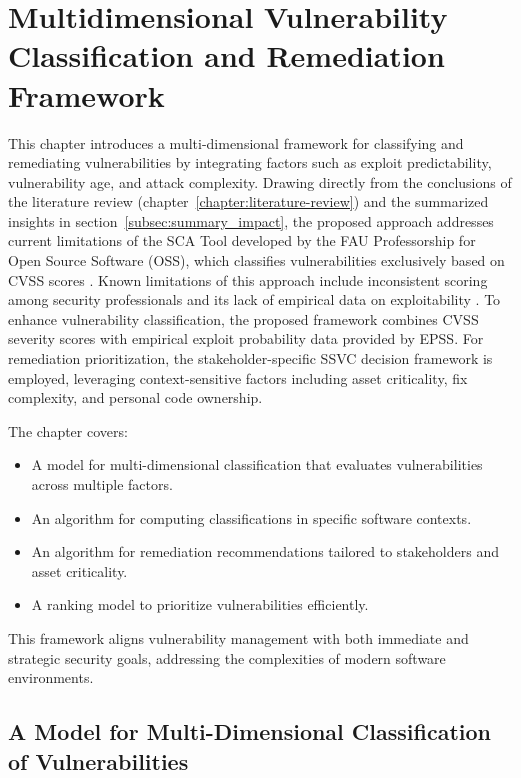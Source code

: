 \chapter{Multidimensional Vulnerability \\ Classification and Remediation Framework}
\label{chapter:multidimensional-vulnerability-classification}

This chapter introduces a multi-dimensional framework for classifying and remediating vulnerabilities by integrating factors such as exploit predictability, vulnerability age, and attack complexity. Drawing directly from the conclusions of the literature review (chapter~\ref{chapter:literature-review}) and the summarized insights in section~\ref{subsec:summary_impact}, the proposed approach addresses current limitations of the \ac{SCA} Tool developed by the \ac{FAU} Professorship for Open Source Software (\ac{OSS}), which classifies vulnerabilities exclusively based on \ac{CVSS} scores \autocite{nehrke_webdienst_2023}. Known limitations of this approach include inconsistent scoring among security professionals and its lack of empirical data on exploitability \autocite{spring_time_2021, jacobs_exploit_2021}. To enhance vulnerability classification, the proposed framework combines \ac{CVSS} severity scores with empirical exploit probability data provided by \ac{EPSS}.
For remediation prioritization, the stakeholder-specific \ac{SSVC} decision framework is employed, leveraging context-sensitive factors including asset criticality, fix complexity, and personal code ownership.

The chapter covers:
\begin{itemize}
    \item A model for multi-dimensional classification that evaluates vulnerabilities across multiple factors.
    \item An algorithm for computing classifications in specific software contexts.
    \item An algorithm for remediation recommendations tailored to stakeholders and asset criticality.
    \item A ranking model to prioritize vulnerabilities efficiently.
\end{itemize}

This framework aligns vulnerability management with both immediate and strategic security goals, addressing the complexities of modern software environments.

\section{A Model for Multi-Dimensional Classification of Vulnerabilities}
\label{sec:multi-dimensional-classification}

